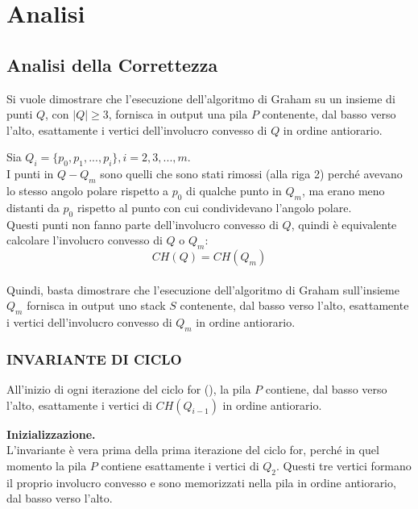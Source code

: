 \documentclass[12pt,a4paper]{report}
\begin{document}
\chapter{Analisi}\label{ch:anallisi}

\section{Analisi della Correttezza}\label{ch:correttezza}
Si vuole dimostrare che l'esecuzione dell'algoritmo di Graham su un insieme di punti $Q$, con $|Q| \geq 3$, fornisca in output una pila $P$ contenente, dal basso verso l'alto, esattamente i vertici dell'involucro convesso di $Q$ in ordine antiorario.

\vspace{0.5cm}

\noindent Sia $Q_i = \{ p_0, p_1, ..., p_i \}, i = 2, 3, ..., m$.\\
I punti in $Q - Q_m$ sono quelli che sono stati rimossi (alla riga 2) perché avevano lo stesso angolo polare rispetto a $p_0$ di qualche punto in $Q_m$, ma erano meno distanti da $p_0$ rispetto al punto con cui condividevano l'angolo polare.\\
Questi punti non fanno parte dell'involucro convesso di $Q$, quindi è equivalente calcolare l'involucro convesso di $Q$ o $Q_m$:
\[  CH(Q) = CH(Q_m) \]\\
Quindi, basta dimostrare che l'esecuzione dell'algoritmo di Graham sull'insieme $Q_m$ fornisca in output uno stack $S$ contenente, dal basso verso l'alto, esattamente i vertici dell'involucro convesso di $Q_m$ in ordine antiorario.

\subsection*{\small{INVARIANTE DI CICLO}}
All'inizio di ogni iterazione del ciclo for (), la pila $P$ contiene, dal basso verso l'alto, esattamente i vertici di $CH(Q_{i-1})$ in ordine antiorario.

\vspace{0.5cm}

\noindent \textbf{Inizializzazione.}\\
L'invariante è vera prima della prima iterazione del ciclo for, perché in quel momento la pila $P$ contiene esattamente i vertici di $Q_2$. Questi tre vertici formano il proprio involucro convesso e sono memorizzati nella pila in ordine antiorario, dal basso verso l'alto.

\pagebreak
\end{document}
